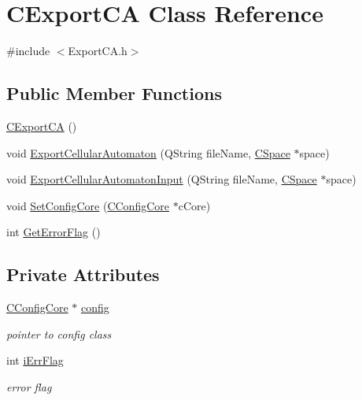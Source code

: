 \hypertarget{classCExportCA}{
\section{CExportCA Class Reference}
\label{classCExportCA}
}


{\ttfamily \#include $<$ExportCA.h$>$}\subsection*{Public Member Functions}
\begin{DoxyCompactItemize}
\item 
\hyperlink{classCExportCA_a53f333999ac0fbc58f80058d27518502}{CExportCA} ()
\item 
void \hyperlink{classCExportCA_a9bc0574ebc0672985fb7700c5a5d04a9}{ExportCellularAutomaton} (QString fileName, \hyperlink{classCSpace}{CSpace} $\ast$space)
\item 
void \hyperlink{classCExportCA_ad805bf09d9c72c60ba662d4d9d2fe117}{ExportCellularAutomatonInput} (QString fileName, \hyperlink{classCSpace}{CSpace} $\ast$space)
\item 
void \hyperlink{classCExportCA_a36ef474f274f8cb123073968d6e33a9d}{SetConfigCore} (\hyperlink{classCConfigCore}{CConfigCore} $\ast$cCore)
\item 
int \hyperlink{classCExportCA_a88c08f02b37ad712b7d924544ec6b15f}{GetErrorFlag} ()
\end{DoxyCompactItemize}
\subsection*{Private Attributes}
\begin{DoxyCompactItemize}
\item 
\hypertarget{classCExportCA_a211f03265e70aa2bcb25e5f4e56084ff}{
\hyperlink{classCConfigCore}{CConfigCore} $\ast$ \hyperlink{classCExportCA_a211f03265e70aa2bcb25e5f4e56084ff}{config}}
\label{classCExportCA_a211f03265e70aa2bcb25e5f4e56084ff}

\begin{DoxyCompactList}\small\item\em pointer to config class \item\end{DoxyCompactList}\item 
\hypertarget{classCExportCA_aec825a9dcb2001305918a8764ae311cf}{
int \hyperlink{classCExportCA_aec825a9dcb2001305918a8764ae311cf}{iErrFlag}}
\label{classCExportCA_aec825a9dcb2001305918a8764ae311cf}

\begin{DoxyCompactList}\small\item\em error flag \item\end{DoxyCompactList}\end{DoxyCompactItemize}


